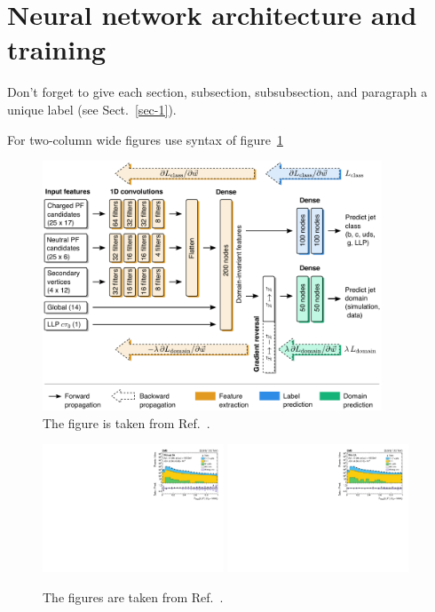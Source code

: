 \documentclass{webofc}
\begin{document}
\section{Neural network architecture and training}
\label{sec-2}
Don't forget to give each section, subsection, subsubsection, and
paragraph a unique label (see Sect.~\ref{sec-1}).

For two-column wide figures use syntax of figure~\ref{fig-2}

\begin{figure}[!ht]
\includegraphics[width=0.9\textwidth]{figs/network.pdf}
\centering
\caption{The figure is taken from Ref.~\cite{CMS-EXO-19-011}.}
\label{fig-2}
\end{figure}

\begin{figure}[!ht]
\includegraphics[width=0.48\textwidth]{figs/2mu_2toNj__llpdnnx_noda_0_max_highpt.pdf}\hspace{0.03\textwidth}
\includegraphics[width=0.48\textwidth]{figs/2mu_2toNj__llpdnnx_da_0_max_highpt.pdf}
\centering
\caption{The figures are taken from Ref.~\cite{CMS-EXO-19-011}.}
\label{fig-3}
\end{figure}
\end{document}
